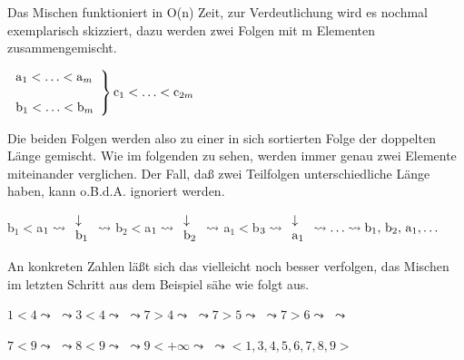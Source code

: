 \documentclass{scrreprt}%
\theoremstyle{break}
\begin{document}
Das Mischen funktioniert in O(n) Zeit, zur Verdeutlichung wird es nochmal exemplarisch skizziert, dazu werden zwei Folgen mit m
Elementen zusammengemischt.

$\left. 
\begin{array}{l}
{\textrm{\textup{a}}}_1<\ldots<{\textrm{\textup{a}}}_m\\
\phantom{leer}\\
{\textrm{\textup{b}}}_1<\ldots<{\textrm{\textup{b}}}_m
\end{array}
\right\} {\textrm{\textup{c}}}_1<\ldots<{\textrm{\textup{c}}}_{2m}$
\bigskip

Die beiden Folgen werden also zu einer in sich sortierten Folge der doppelten Länge gemischt. Wie im folgenden zu sehen, werden immer genau
zwei Elemente miteinander verglichen. Der Fall, daß zwei Teilfolgen unterschiedliche Länge haben, kann o.B.d.A. ignoriert werden.
\bigskip

b$_1<$a$_1 \leadsto \begin{array}{l}
\downarrow\\
{\textrm{\textup{b}}}_1
\end{array} \leadsto$
b$_2<$a$_1 \leadsto \begin{array}{l}
\downarrow\\
{\textrm{\textup{b}}}_2
\end{array} \leadsto$
a$_1<$b$_3 \leadsto \begin{array}{l}
\downarrow\\
{\textrm{\textup{a}}}_1
\end{array} \leadsto \ldots \leadsto {\textrm{\textup{b}}}_1, \, {\textrm{\textup{b}}}_2, \, {\textrm{\textup{a}}}_1, \ldots$
\bigskip

An konkreten Zahlen läßt sich das vielleicht noch besser verfolgen, das Mischen im letzten Schritt aus dem Beispiel sähe wie folgt aus.
\bigskip

$1<4 \leadsto$  $\leadsto
3<4 \leadsto$  $\leadsto
7>4 \leadsto$  $\leadsto 
7>5 \leadsto$  $\leadsto
7>6 \leadsto$  $\leadsto$
\medskip

$7<9 \leadsto$  $\leadsto
8<9 \leadsto$  $\leadsto
9<+\infty \leadsto$  $
\leadsto<1,3,4,5,6,7,8,9>$
\medskip
\end{document}
